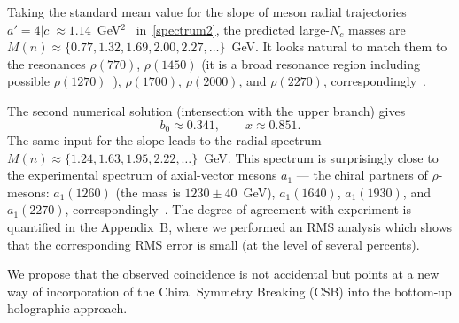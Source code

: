 \documentclass[a4paper,11pt]{article}
\begin{document}
Taking the standard mean value for the slope
of meson radial trajectories $a'=4|c|\approx1.14$~GeV$^2$~\cite{Bugg:2004xu} in~\eqref{spectrum2}, the
predicted large-$N_c$ masses are $M(n)\approx\{0.77,1.32,1.69,2.00,2.27,\dots\}$~GeV. It looks natural to match
them to the resonances $\rho(770)$, $\rho(1450)$ (it is a broad resonance region including possible $\rho(1270)$~\cite{pdg}),
$\rho(1700)$, $\rho(2000)$, and $\rho(2270)$, correspondingly~\cite{pdg}.

The second numerical solution (intersection with the upper branch) gives
\begin{equation}
\label{sol2}
  b_0\approx0.341,\qquad
  x\approx0.851.
\end{equation}
The same input for the slope leads to the radial spectrum
$M(n)\approx\{1.24,1.63,1.95,2.22,\dots\}$~GeV. This spectrum is
surprisingly close to the experimental spectrum of axial-vector mesons $a_1$
--- the chiral partners of $\rho$-mesons:  $a_1(1260)$ (the mass is $1230\pm40$~GeV),
$a_1(1640)$, $a_1(1930)$, and $a_1(2270)$, correspondingly~\cite{pdg}.
The degree of agreement with experiment is quantified in the Appendix~B, where we performed
an RMS analysis which shows that the corresponding RMS error is small (at the level of several percents).

We propose that the observed coincidence is not accidental but points at a new way of
incorporation of the Chiral Symmetry Breaking (CSB) into the bottom-up holographic approach.
\end{document}

